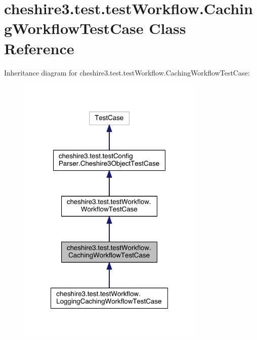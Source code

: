 \hypertarget{classcheshire3_1_1test_1_1test_workflow_1_1_caching_workflow_test_case}{\section{cheshire3.\-test.\-test\-Workflow.\-Caching\-Workflow\-Test\-Case Class Reference}
\label{classcheshire3_1_1test_1_1test_workflow_1_1_caching_workflow_test_case}
}


Inheritance diagram for cheshire3.\-test.\-test\-Workflow.\-Caching\-Workflow\-Test\-Case\-:
\nopagebreak
\begin{figure}[H]
\begin{center}
\leavevmode
\includegraphics[width=252pt]{classcheshire3_1_1test_1_1test_workflow_1_1_caching_workflow_test_case__inherit__graph}
\end{center}
\end{figure}


